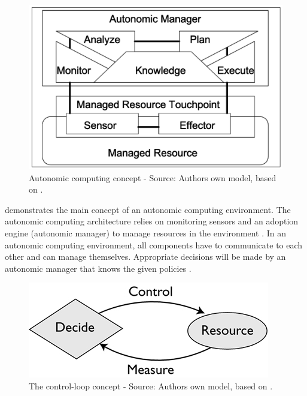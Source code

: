 \begin{figure}[h]
\centering
\includegraphics[scale=1]{images/04_technical_background/ac_concept}
\caption{Autonomic computing concept - Source: Authors own model, based on \cite{Jacob2004AutonomicSolution}.}
\label{fig:ac_concept}
\end{figure}

 demonstrates the main concept of an autonomic computing environment. The autonomic computing architecture relies on monitoring sensors and an adoption engine (autonomic manager) to manage resources in the environment \cite{Goscinski2011CloudComputing}.
In an autonomic computing environment, all components have to communicate to each other and can manage themselves. Appropriate decisions will be made by an autonomic manager that knows the given policies \cite{Jacob2004AutonomicSolution}.

\begin{figure}[h]
\centering
\includegraphics[scale=1]{images/04_technical_background/ac_control_loop}
\caption{The control-loop concept - Source: Authors own model, based on \cite{Murch2004Autonomic}.}
\label{fig:ac_control_loop}
\end{figure}

